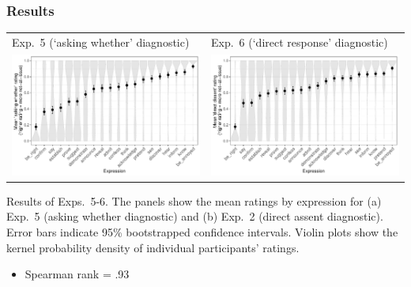 \documentclass[compress, xcolor = dvipsnames, aspectratio=169, handout]{beamer}
\begin{document}
	\begin{frame}[t]\frametitle{Results}\scriptsize

	      \centering
	      \begin{tabular}{p{.48\linewidth} p{.48\linewidth}}
	      	Exp.~5 (`asking whether' diagnostic)
	      	&
	      	Exp.~6 (`direct response' diagnostic)\\ 
	      	\includegraphics[width=\linewidth]{../../results/exp5/graphs/mean-ratings.pdf}%
	      	&
	      	\includegraphics[width=\linewidth]{../../results/exp6/graphs/mean-ratings.pdf}
	      	\\
	      \end{tabular}

	      Results of Exps.~5-6. The panels show the mean ratings by expression for (a) Exp.~5 (asking whether diagnostic) and (b) Exp.~2 (direct assent diagnostic). Error bars indicate 95\% bootstrapped confidence intervals. Violin plots show the kernel probability density of individual participants' ratings.

	      \begin{itemize}
	      	\item Spearman rank = .93
	      \end{itemize}
	
	\end{frame}
\end{document}
